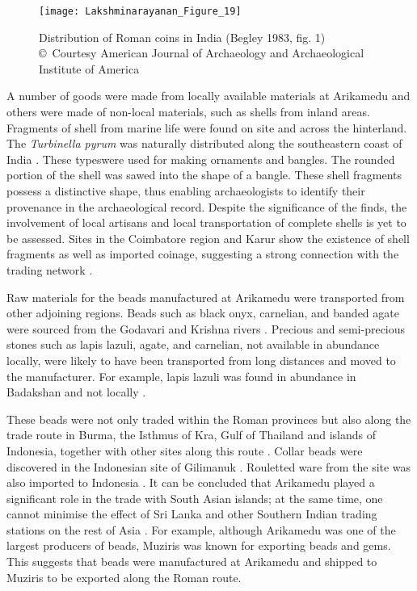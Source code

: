 \begin{figure}[!htb]
	\texttt{[image: Lakshminarayanan\_Figure\_19]}
	\caption{Distribution of Roman coins in India (Begley 1983, fig. 1)\\
		{\normalfont\scriptsize\copyright\ Courtesy American Journal of Archaeology and Archaeological Institute of America
	}}
	\label{fig:Lakshminarayanan_Figure_19}
\end{figure}

A number of goods were made from locally available materials at Arikamedu and others were made of non-local materials, such as shells from inland areas. Fragments of shell from marine life were found on site and across the hinterland. The \emph{Turbinella pyrum} was naturally distributed along the southeastern coast of India \parencites[][141]{smith2002}[][]{nagappan1974}. These typeswere used for making ornaments and bangles. The rounded portion of the shell was sawed into the shape of a bangle. These shell fragments possess a distinctive shape, thus enabling archaeologists to identify their provenance in the archaeological record. Despite the significance of the finds, the involvement of local artisans and local transportation of complete shells is yet to be assessed. Sites in the Coimbatore region and Karur show the existence of shell fragments as well as imported coinage, suggesting a strong connection with the trading network \parencite[][26]{kamalakar2000}.

Raw materials for the beads manufactured at Arikamedu were transported from other adjoining regions. Beads such as black onyx, carnelian, and banded agate were sourced from the Godavari and Krishna rivers \parencite[][115]{francis2002}. Precious and semi-precious stones such as lapis lazuli, agate, and carnelian, not available in abundance locally, were likely to have been transported from long distances and moved to the manufacturer. For example, lapis lazuli was found in abundance in Badakshan and not locally \parencite[][29]{mairs2016}.

These beads were not only traded within the Roman provinces but also along the trade route in Burma, the Isthmus of Kra, Gulf of Thailand and islands of Indonesia, together with other sites along this route \parencite[][106]{howard2012}. Collar beads were discovered in the Indonesian site of Gilimanuk \parencite[][46]{francis2002}. Rouletted ware from the site was also imported to Indonesia \parencite[][229]{ardika1991}. It can be concluded that Arikamedu played a significant role in the trade with South Asian islands; at the same time, one cannot minimise the effect of Sri Lanka and other Southern Indian trading stations on the rest of Asia \parencite[][46]{francis2002}. For example, although Arikamedu was one of the largest producers of beads, Muziris was known for exporting beads and gems. This suggests that beads were manufactured at Arikamedu and shipped to Muziris to be exported along the Roman route.

